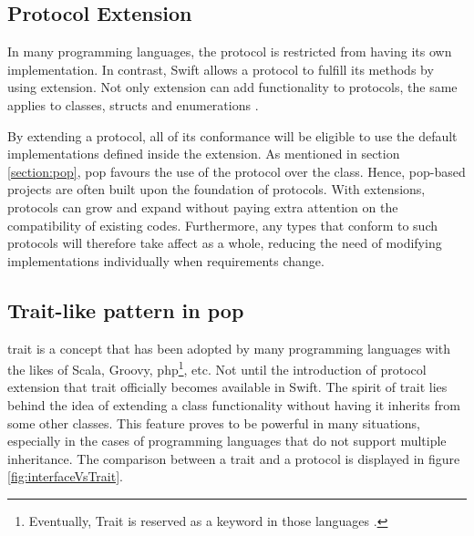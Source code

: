 \documentclass[11pt,a4paper,oneside,article]{memoir}
\begin{document}
\subsection{Protocol Extension}\label{protocolextension}
In many programming languages, the protocol is restricted from having its own implementation. In contrast, Swift allows a protocol to fulfill its methods by using extension. Not only extension can add functionality to protocols, the same applies to classes, structs and enumerations \cite{apple:extension}.

By extending a protocol, all of its conformance will be eligible to use the default implementations defined inside the extension. As mentioned in section \ref{section:pop}, \gls{pop} favours the use of the protocol over the class. Hence, \gls{pop}-based projects are often built upon the foundation of protocols. With extensions, protocols can grow and expand without paying extra attention on the compatibility %
of existing codes. Furthermore, any types that conform to such protocols will therefore take affect %
as a whole, reducing the need of modifying implementations individually when requirements change.

\subsection{Trait-like pattern in \gls{pop}}
\Gls{trait} is a concept that has been adopted by many programming languages with the likes of Scala, Groovy, \gls{php}\footnote{Eventually, Trait is  reserved as a keyword in those languages \cite{scala:trait, groovy:trait, php:trait}.}, etc. Not until the introduction of protocol extension that \gls{trait} officially becomes available in Swift. The spirit of \gls{trait} lies behind the idea of extending a class functionality without having it inherits from some other classes. This feature proves to be powerful in many situations, especially in the cases of programming languages that do not support multiple inheritance. The comparison between a trait and a protocol is displayed in figure \ref{fig:interfaceVsTrait}. 
\end{document}
